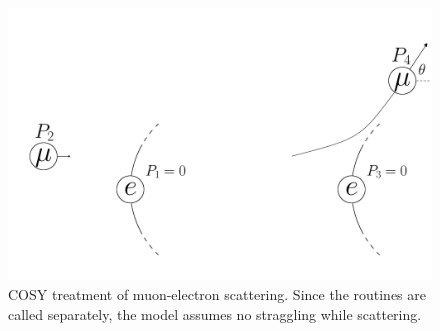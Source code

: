 \begin{figure}
  \centering
    \includegraphics[width=\textwidth]{Figures/MottScattering} 
  \caption[COSY treatment of muon-electron scattering.]{COSY treatment of muon-electron scattering. Since the routines are called separately, the model assumes no straggling while scattering.}
  \label{fig:mottScattering}
\end{figure}

